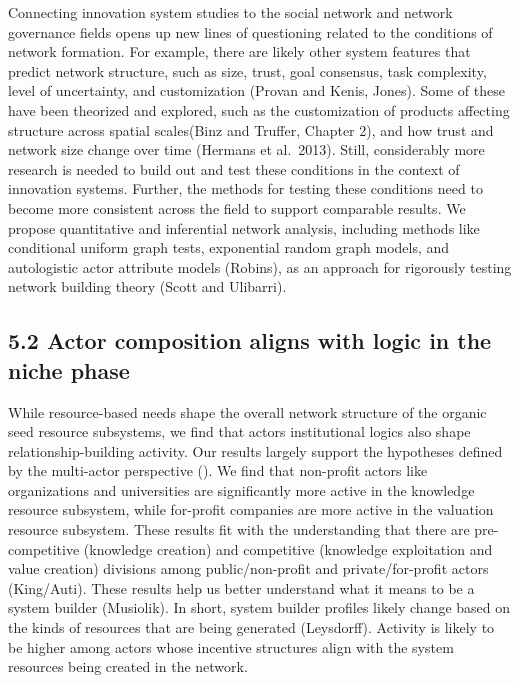 \documentclass[twoside,12pt,final]{ucthesis-CA2012}
\begin{document}
\begin{ucmainmatter}
Connecting innovation system studies to the social network and network
governance fields opens up new lines of questioning related to the
conditions of network formation. For example, there are likely other
system features that predict network structure, such as size, trust,
goal consensus, task complexity, level of uncertainty, and customization
(Provan and Kenis, Jones). Some of these have been theorized and
explored, such as the customization of products affecting structure
across spatial scales(Binz and Truffer, Chapter 2), and how trust and
network size change over time (Hermans et al.~2013). Still, considerably
more research is needed to build out and test these conditions in the
context of innovation systems. Further, the methods for testing these
conditions need to become more consistent across the field to support
comparable results. We propose quantitative and inferential network
analysis, including methods like conditional uniform graph tests,
exponential random graph models, and autologistic actor attribute models
(Robins), as an approach for rigorously testing network building theory
(Scott and Ulibarri).

\hypertarget{actor-composition-aligns-with-logic-in-the-niche-phase}{%
\subsection{5.2 Actor composition aligns with logic in the niche phase}\label{actor-composition-aligns-with-logic-in-the-niche-phase}}

While resource-based needs shape the overall network structure of the
organic seed resource subsystems, we find that actors\textquotesingle{} institutional
logics also shape relationship-building activity. Our results largely
support the hypotheses defined by the multi-actor perspective (). We
find that non-profit actors like organizations and universities are
significantly more active in the knowledge resource subsystem, while
for-profit companies are more active in the valuation resource
subsystem. These results fit with the understanding that there are
pre-competitive (knowledge creation) and competitive (knowledge
exploitation and value creation) divisions among public/non-profit and
private/for-profit actors (King/Auti). These results help us better
understand what it means to be a \textquotesingle system builder\textquotesingle{} (Musiolik). In
short, system builder profiles likely change based on the kinds of
resources that are being generated (Leysdorff). Activity is likely to be
higher among actors whose incentive structures align with the system
resources being created in the network.


\end{ucmainmatter}
\end{document}
